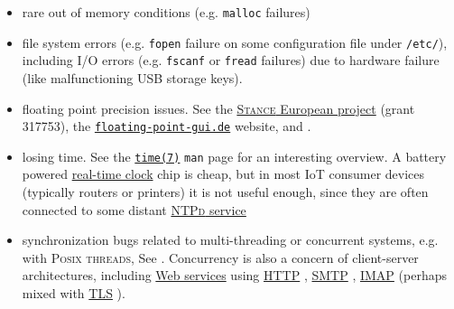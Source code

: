  \begin{itemize}

 \item rare out of memory conditions  (e.g. \texttt{malloc} failures)

 \item file system  errors (e.g. \texttt{fopen}
   failure on some  
    configuration
   file under \texttt{/etc/}), including I/O errors 
     (e.g. \texttt{fscanf} or \texttt{fread} failures) due
    to hardware failure (like malfunctioning USB
   storage keys).

     \item floating point  precision
       issues.  See the  \href{http://www.stance-project.eu/}{\textsc{Stance}
         European project} (grant 317753), the
       \href{https://floating-point-gui.de/}{\texttt{floating-point-gui.de}}
       website, and \cite{Kiss:2015:combining, goubault:2011:static}.

     \item losing  time. See the
       \href{https://man7.org/linux/man-pages/man7/time.7.html}{\texttt{time(7)}}
       \texttt{man} page for an interesting overview. A battery
       powered 
       \href{https://en.wikipedia.org/wiki/Real-time_clock}{real-time
         clock} chip is cheap, but in most IoT consumer devices
       (typically routers or printers) it is not useful enough, since
       they are often connected to some distant
       \href{https://en.wikipedia.org/wiki/Ntpd}{\textsc{NTPd}
         service}

       \item synchronization bugs related to multi-threading or
         concurrent systems, e.g. with \textsc{Posix threads}, See
         \cite{goubault:2005:practical, sangiorgi:2003:pi,
           david:2013:everything,
           guerraoui:2018:concurrent-systems}. Concurrency is also a
         concern of client-server architectures, including
         \href{https://en.wikipedia.org/wiki/Web_service}{Web
           services}  using
         \href{https://en.wikipedia.org/wiki/Hypertext_Transfer_Protocol}{HTTP}
         ,
         \href{https://en.wikipedia.org/wiki/Simple_Mail_Transfer_Protocol}{SMTP}
         ,
         \href{https://en.wikipedia.org/wiki/Internet_Message_Access_Protocol}{IMAP}
          (perhaps mixed with
         \href{https://en.wikipedia.org/wiki/Transport_Layer_Security}{TLS}
         ).
         
 \end{itemize}

